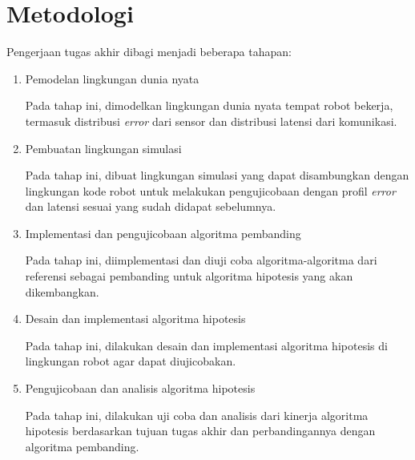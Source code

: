 \section{Metodologi}

Pengerjaan tugas akhir dibagi menjadi beberapa tahapan:

\begin{enumerate}
    \item Pemodelan lingkungan dunia nyata

        Pada tahap ini, dimodelkan lingkungan dunia nyata tempat robot bekerja, termasuk distribusi \textit{error} dari sensor dan distribusi latensi dari komunikasi.

    \item Pembuatan lingkungan simulasi

        Pada tahap ini, dibuat lingkungan simulasi yang dapat disambungkan dengan lingkungan kode robot untuk melakukan pengujicobaan dengan profil \textit{error} dan latensi sesuai yang sudah didapat sebelumnya.

    \item Implementasi dan pengujicobaan algoritma pembanding

        Pada tahap ini, diimplementasi dan diuji coba algoritma-algoritma dari referensi sebagai pembanding untuk algoritma hipotesis yang akan dikembangkan.

    \item Desain dan implementasi algoritma hipotesis

        Pada tahap ini, dilakukan desain dan implementasi algoritma hipotesis di lingkungan robot agar dapat diujicobakan.

    \item Pengujicobaan dan analisis algoritma hipotesis

        Pada tahap ini, dilakukan uji coba dan analisis dari kinerja algoritma hipotesis berdasarkan tujuan tugas akhir dan perbandingannya dengan algoritma pembanding.
\end{enumerate}
